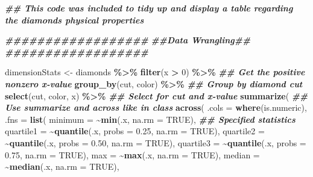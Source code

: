 \documentclass[
]{article}
\newenvironment{Shaded}{\begin{snugshade}}{\end{snugshade}}
\newcommand{\AttributeTok}[1]{\textcolor[rgb]{0.13,0.29,0.53}{#1}}
\newcommand{\ConstantTok}[1]{\textcolor[rgb]{0.56,0.35,0.01}{#1}}
\newcommand{\DecValTok}[1]{\textcolor[rgb]{0.00,0.00,0.81}{#1}}
\newcommand{\DocumentationTok}[1]{\textcolor[rgb]{0.56,0.35,0.01}{\textbf{\textit{#1}}}}
\newcommand{\FloatTok}[1]{\textcolor[rgb]{0.00,0.00,0.81}{#1}}
\newcommand{\FunctionTok}[1]{\textcolor[rgb]{0.13,0.29,0.53}{\textbf{#1}}}
\newcommand{\NormalTok}[1]{#1}
\newcommand{\OtherTok}[1]{\textcolor[rgb]{0.56,0.35,0.01}{#1}}
\newcommand{\SpecialCharTok}[1]{\textcolor[rgb]{0.81,0.36,0.00}{\textbf{#1}}}
\begin{document}
\begin{Shaded}
\begin{Highlighting}[]
\DocumentationTok{\#\# This code was included to tidy up and display a table regarding the diamonds\textquotesingle{} physical properties}

\DocumentationTok{\#\#\#\#\#\#\#\#\#\#\#\#\#\#\#\#\#\#}
\DocumentationTok{\#\#Data Wrangling\#\#}
\DocumentationTok{\#\#\#\#\#\#\#\#\#\#\#\#\#\#\#\#\#\#}

\NormalTok{dimensionStats }\OtherTok{\textless{}{-}}\NormalTok{ diamonds }\SpecialCharTok{\%\textgreater{}\%}                                      
  \FunctionTok{filter}\NormalTok{(x }\SpecialCharTok{\textgreater{}} \DecValTok{0}\NormalTok{) }\SpecialCharTok{\%\textgreater{}\%}                                              \DocumentationTok{\#\# Get the positive nonzero x{-}value}
  \FunctionTok{group\_by}\NormalTok{(cut, color) }\SpecialCharTok{\%\textgreater{}\%}                                              \DocumentationTok{\#\# Group by diamond cut}
  \FunctionTok{select}\NormalTok{(cut, color, x) }\SpecialCharTok{\%\textgreater{}\%}                                             \DocumentationTok{\#\# Select for cut and x{-}value}
  \FunctionTok{summarize}\NormalTok{(                                                     }\DocumentationTok{\#\# Use summarize and across like in class}
    \FunctionTok{across}\NormalTok{(}
      \AttributeTok{.cols =} \FunctionTok{where}\NormalTok{(is.numeric),}
      \AttributeTok{.fns =} \FunctionTok{list}\NormalTok{(}
        \AttributeTok{minimum =} \SpecialCharTok{\textasciitilde{}}\FunctionTok{min}\NormalTok{(.x, }\AttributeTok{na.rm =} \ConstantTok{TRUE}\NormalTok{),                        }\DocumentationTok{\#\# Specified statistics}
        \AttributeTok{quartile1 =} \SpecialCharTok{\textasciitilde{}}\FunctionTok{quantile}\NormalTok{(.x, }\AttributeTok{probs =} \FloatTok{0.25}\NormalTok{, }\AttributeTok{na.rm =} \ConstantTok{TRUE}\NormalTok{),}
        \AttributeTok{quartile2 =} \SpecialCharTok{\textasciitilde{}}\FunctionTok{quantile}\NormalTok{(.x, }\AttributeTok{probs =} \FloatTok{0.50}\NormalTok{, }\AttributeTok{na.rm =} \ConstantTok{TRUE}\NormalTok{),}
        \AttributeTok{quartile3 =} \SpecialCharTok{\textasciitilde{}}\FunctionTok{quantile}\NormalTok{(.x, }\AttributeTok{probs =} \FloatTok{0.75}\NormalTok{, }\AttributeTok{na.rm =} \ConstantTok{TRUE}\NormalTok{),}
        \AttributeTok{max =} \SpecialCharTok{\textasciitilde{}}\FunctionTok{max}\NormalTok{(.x, }\AttributeTok{na.rm =} \ConstantTok{TRUE}\NormalTok{),}
        \AttributeTok{median =} \SpecialCharTok{\textasciitilde{}}\FunctionTok{median}\NormalTok{(.x, }\AttributeTok{na.rm =} \ConstantTok{TRUE}\NormalTok{),}

\end{Highlighting}
\end{Shaded}
\end{document}
